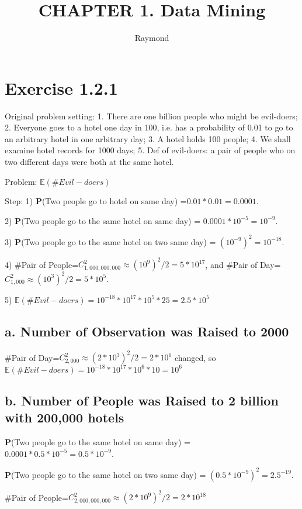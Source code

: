 \documentclass{article}
\title{CHAPTER 1. Data Mining}
\author{Raymond}
\begin{document}
\maketitle


\section{Exercise 1.2.1}
Original problem setting: 1. There are one billion people who might be evil-doers; 2. Everyone goes to a hotel one day in 100, i.e. has a probability of 0.01 to go to an arbitrary hotel in one arbitrary day; 3. A hotel holds 100 people; 4. We shall examine hotel records for 1000 days; 5. Def of evil-doers: a pair of people who on two different days were both at the same hotel. 

Problem:  $\mathbb{E}(\#Evil-doers)$

Step: 1) \textbf{P}(Two people go to hotel on same day) =$ 0.01 * 0.01 =0.0001$. 

2) \textbf{P}(Two people go to the same hotel on same day) = $0.0001 * 10^{-5}=10^{-9}$. 

3) \textbf{P}(Two people go to the same hotel on two same day) = $(10^{-9})^2 = 10^{-18}$.

 4) \#Pair of People=$C^2_{1,000,000,000}\approx (10^9)^2/2=5*10^{17}$, and \#Pair of Day=$C^2_{1,000}\approx (10^3)^2/2=5*10^{5}$. 
 
 5) $\mathbb{E}(\#Evil-doers)=10^{-18} * 10^{17}*10^{5}*25=2.5*10^5$

\subsection{a. Number of Observation was Raised to 2000}
\#Pair of Day=$C^2_{2,000}\approx (2 *10^3)^2/2=2*10^{6}$ changed, so  $\mathbb{E}(\#Evil-doers)=10^{-18} * 10^{17}*10^{6}*10=10^6$

\subsection{b. Number of People was Raised to 2 billion with 200,000 hotels}

\textbf{P}(Two people go to the same hotel on same day) = $0.0001 * 0.5 * 10^{-5}=0.5 * 10^{-9}$. 

\textbf{P}(Two people go to the same hotel on two same day) = $(0.5 * 10^{-9})^2 = 2.5^{-19}$.

\#Pair of People=$C^2_{2,000,000,000}\approx (2*10^9)^2/2=2*10^{18}$
\end{document}
